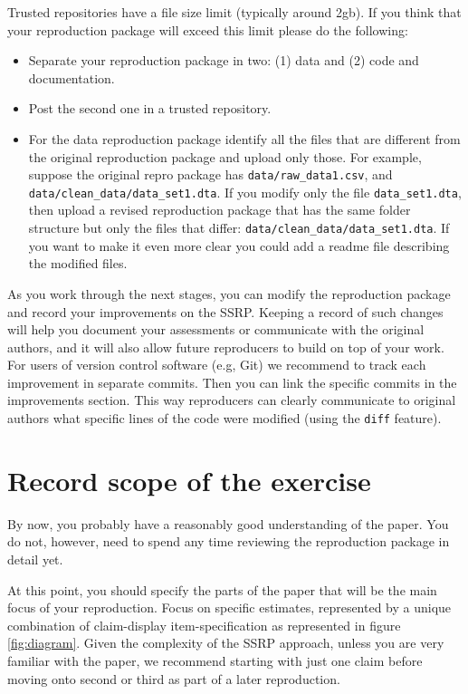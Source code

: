 \documentclass[
  openany]{book}
\providecommand{\tightlist}{%
  \setlength{\itemsep}{0pt}\setlength{\parskip}{0pt}}
\begin{document}
Trusted repositories have a file size limit (typically around 2gb). If you think that your reproduction package will exceed this limit please do the following:

\begin{itemize}
\tightlist
\item
  Separate your reproduction package in two: (1) data and (2) code and documentation.\\
\item
  Post the second one in a trusted repository.\\
\item
  For the data reproduction package identify all the files that are different from the original reproduction package and upload only those. For example, suppose the original repro package has \texttt{data/raw\_data1.csv}, and \texttt{data/clean\_data/data\_set1.dta}. If you modify only the file \texttt{data\_set1.dta}, then upload a revised reproduction package that has the same folder structure but only the files that differ: \texttt{data/clean\_data/data\_set1.dta}. If you want to make it even more clear you could add a readme file describing the modified files.
\end{itemize}

As you work through the next stages, you can modify the reproduction package and record your improvements on the SSRP. Keeping a record of such changes will help you document your assessments or communicate with the original authors, and it will also allow future reproducers to build on top of your work. For users of version control software (e.g, Git) we recommend to track each improvement in separate commits. Then you can link the specific commits in the improvements section. This way reproducers can clearly communicate to original authors what specific lines of the code were modified (using the \texttt{diff} feature).

\hypertarget{declare-estimates}{%
\section{Record scope of the exercise}\label{declare-estimates}}

By now, you probably have a reasonably good understanding of the paper. You do not, however, need to spend any time reviewing the reproduction package in detail yet.

At this point, you should specify the parts of the paper that will be the main focus of your reproduction. Focus on specific estimates, represented by a unique combination of claim-display item-specification as represented in figure \ref{fig:diagram}. Given the complexity of the SSRP approach, unless you are very familiar with the paper, we recommend starting with just one claim before moving onto second or third as part of a later reproduction.
\end{document}
